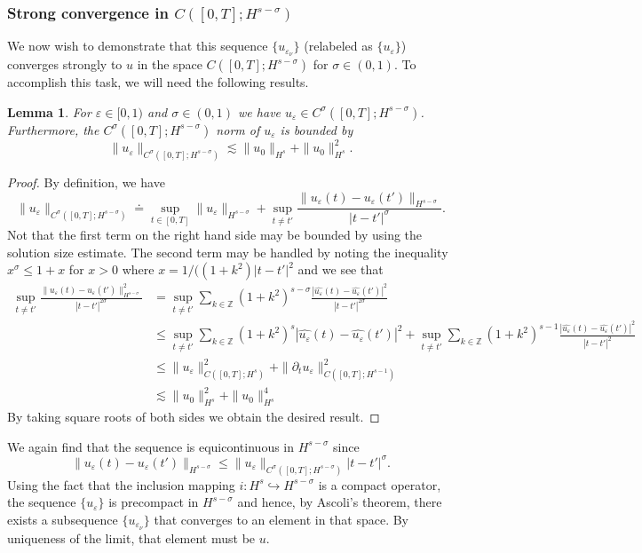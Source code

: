 \documentclass[reqno]{amsart}
\theoremstyle{plain}
\newtheorem{lemma}{Lemma}[section]
\numberwithin{equation}{section}
\newcommand{\p}{\partial}
\newcommand{\zz}{\mathbb{Z}}
\newcommand{\wh}{\widehat}
\newcommand{\ee}{\varepsilon}
\newcommand{\s}{\sigma}
\begin{document}
\subsubsection{Strong convergence in $C([0,T]; H^{s-\s})$}We now wish to demonstrate that this sequence $\{u_{\ee_\nu}\}$ (relabeled as $\{u_\ee\}$) converges strongly to $u$ in the space $C([0,T];H^{s-\s})$ for $\s \in (0,1)$.  To accomplish this task, we will need the following results.

\begin{lemma}
For $\ee \in [0,1)$ and $\s \in (0,1)$ we have $u_\ee \in C^\s([0,T];H^{s-\s})$.  Furthermore, the $C^\s([0,T];H^{s-\s})$ norm of $u_\ee$ is bounded by
\[
\|u_\ee\|_{C^\s([0,T];H^{s-\s})} \lesssim \|u_0\|_{H^s}+\|u_0\|_{H^s}^2.
\]
\end{lemma}

\begin{proof}
    By definition, we have
    \[
    \|u_\ee\|_{C^\s([0,T];H^{s-\s})} \doteq \sup_{t \in [0,T]}\|u_\ee\|_{H^{s-\s}}+\sup_{t \neq t'}\frac{\|u_\ee(t)-u_\ee(t')\|_{H^{s-\s}}}{|t-t'|^{\s}}.
    \]
  Not that the first term on the right hand side may be bounded by using the solution size estimate.  The second term may be handled by noting the inequality $x^\s \leq 1+x$ for $x>0$ where $x = 1/((1+k^2)|t-t'|^2$ and we see that
  \begin{align*}
      \sup_{t \neq t'}\frac{\|u_\ee(t)-u_\ee(t')\|_{H^{s-\s}}^2}{|t-t'|^{2\s}} & = \sup_{t \neq t'}\sum_{k \in \zz}(1+k^2)^{s-\s}\frac{|\wh{u_\ee}(t)-\wh{u_\ee}(t')|^2}{|t-t'|^{2\s}} \\ 
& \leq \sup_{t \neq t'}\sum_{k \in \zz}(1+k^2)^s|\wh{u_\ee}(t)-\wh{u_\ee}(t')|^2+\sup_{t \neq t'}\sum_{k \in \zz}(1+k^2)^{s-1}\frac{|\wh{u_\ee}(t)-\wh{u_\ee}(t')|^2}{|t-t'|^{2}} \\
 &\leq \|u_\ee\|_{C([0,T];H^s)}^2+\|\p_tu_\ee\|_{C([0,T];H^{s-1})}^2 \\ 
 & \lesssim \|u_0\|_{H^s}^2+\|u_0\|_{H^s}^4
  \end{align*}
  By taking square roots of both sides we obtain the desired result.
\end{proof}

We again find that the sequence is equicontinuous in $H^{s-\s}$ since
\[
\|u_\ee(t)-u_\ee(t')\|_{H^{s-\s}} \leq \|u_\ee\|_{C^\s([0,T];H^{s-\s})}|t-t'|^\s.
\]
Using the fact that the inclusion mapping $i:H^s \hookrightarrow H^{s-\s}$ is a compact operator, the sequence $\{u_\ee\}$ is precompact in $H^{s-\s}$ and hence, by Ascoli's theorem, there exists a subsequence $\{u_{\ee_\nu}\}$ that converges to an element in that space.  By uniqueness of the limit, that element must be $u$.
\end{document}
